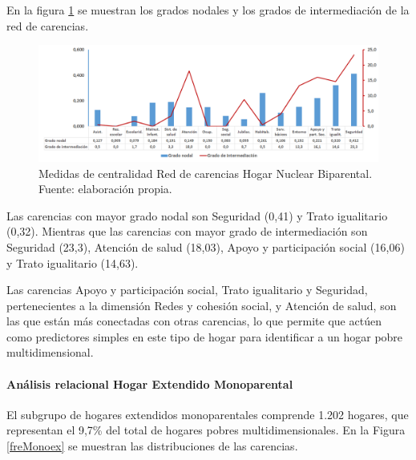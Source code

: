 \documentclass[12pt,letterpaper,spanish]{article}
\begin{document}
En la figura \ref{CenBinuc} se muestran los grados nodales y los grados de intermediación de la red de carencias. 
\begin{figure}[H]
    \centering
    \includegraphics[width=\textwidth]{Grafos/nc_binuc.png}
    \caption{Medidas de centralidad Red de carencias Hogar Nuclear Biparental. Fuente: elaboración propia.}
    \label{CenBinuc}
\end{figure}
Las carencias con mayor grado nodal son Seguridad (0,41) y Trato igualitario (0,32). Mientras que las carencias con mayor grado de intermediación son Seguridad (23,3), Atención de salud (18,03), Apoyo y participación social (16,06) y Trato igualitario (14,63).

Las carencias Apoyo y participación social, Trato igualitario y Seguridad, pertenecientes a la dimensión Redes y cohesión social, y Atención de salud, son las que están más conectadas con otras carencias, lo que permite que actúen como predictores simples en este tipo de hogar para identificar a un hogar pobre multidimensional.  

\paragraph{Análisis relacional Hogar Extendido Monoparental}

El subgrupo de hogares extendidos monoparentales comprende 1.202 hogares, que representan el 9,7\% del total de hogares pobres multidimensionales. En la Figura \ref{freMonoex} se muestran las distribuciones de las carencias.
\end{document}
